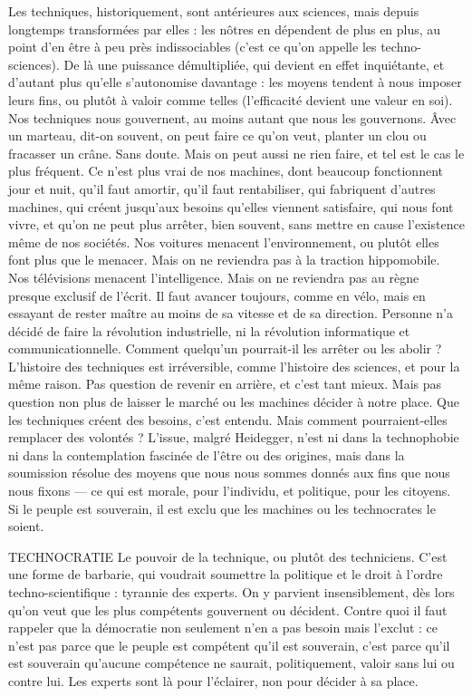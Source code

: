 Les techniques, historiquement, sont antérieures aux sciences, mais depuis
longtemps transformées par elles : les nôtres en dépendent de plus en plus, au
point d’en être à peu près indissociables (c’est ce qu’on appelle les techno-sciences).
De là une puissance démultipliée, qui devient en effet inquiétante, et
d'autant plus qu’elle s’autonomise davantage : les moyens tendent à nous
imposer leurs fins, ou plutôt à valoir comme telles (l’efficacité devient une
valeur en soi). Nos techniques nous gouvernent, au moins autant que nous les
gouvernons. Âvec un marteau, dit-on souvent, on peut faire ce qu’on veut,
planter un clou ou fracasser un crâne. Sans doute. Mais on peut aussi ne rien
faire, et tel est le cas le plus fréquent. Ce n’est plus vrai de nos machines, dont
beaucoup fonctionnent jour et nuit, qu’il faut amortir, qu’il faut rentabiliser,
qui fabriquent d’autres machines, qui créent jusqu'aux besoins qu’elles viennent
satisfaire, qui nous font vivre, et qu’on ne peut plus arrêter, bien souvent,
sans mettre en cause l’existence même de nos sociétés. Nos voitures menacent
l’environnement, ou plutôt elles font plus que le menacer. Mais on ne
reviendra pas à la traction hippomobile. Nos télévisions menacent l’intelligence.
Mais on ne reviendra pas au règne presque exclusif de l'écrit. Il faut
avancer toujours, comme en vélo, mais en essayant de rester maître au moins
de sa vitesse et de sa direction. Personne n’a décidé de faire la révolution industrielle,
ni la révolution informatique et communicationnelle. Comment
quelqu'un pourrait-il les arrêter ou les abolir ? L'histoire des techniques est irréversible,
comme l’histoire des sciences, et pour la même raison. Pas question de
revenir en arrière, et c’est tant mieux. Mais pas question non plus de laisser le
marché ou les machines décider à notre place. Que les techniques créent des
besoins, c’est entendu. Mais comment pourraient-elles remplacer des volontés ?
L'issue, malgré Heidegger, n’est ni dans la technophobie ni dans la contemplation
fascinée de l’être ou des origines, mais dans la soumission résolue des
moyens que nous nous sommes donnés aux fins que nous nous fixons — ce qui
est morale, pour l'individu, et politique, pour les citoyens. Si le peuple est souverain,
il est exclu que les machines ou les technocrates le soient.

TECHNOCRATIE Le pouvoir de la technique, ou plutôt des techniciens.
C’est une forme de barbarie, qui voudrait soumettre la
politique et le droit à l’ordre techno-scientifique : tyrannie des experts. On y
parvient insensiblement, dès lors qu’on veut que les plus compétents gouvernent
ou décident. Contre quoi il faut rappeler que la démocratie non seulement
n’en a pas besoin mais l’exclut : ce n’est pas parce que le peuple est compétent
qu’il est souverain, c’est parce qu’il est souverain qu'aucune compétence
ne saurait, politiquement, valoir sans lui ou contre lui. Les experts sont là pour
l'éclairer, non pour décider à sa place.

